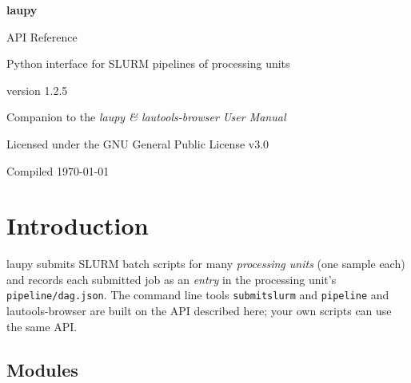 \documentclass[11pt,a4paper]{article}
\DeclareRobustCommand{\_}{\textunderscore\allowbreak}
\newcommand{\cmd}[1]{\texttt{#1}}
\begin{document}
\begin{titlepage}
  \centering
  \vspace*{3cm}
  {\sffamily\Huge\bfseries\color{accent} laupy\par}
  \vspace{0.6cm}
  {\sffamily\LARGE API Reference\par}
  \vspace{1.2cm}
  {\large Python interface for SLURM pipelines of processing units\par}
  \vspace{2cm}
  {\large version 1.2.5\par}
  \vfill
  {\small Companion to the \emph{laupy \& lautools-browser User Manual}\par}
  {\small Licensed under the GNU General Public License v3.0\par}
  {\small Compiled \today\par}
\end{titlepage}

\tableofcontents
\clearpage

\section{Introduction}

laupy submits SLURM batch scripts for many \emph{processing units} (one sample each) and
records each submitted job as an \emph{entry} in the processing unit's
\cmd{pipeline/dag.json}. The command line tools \cmd{submitslurm} and \cmd{pipeline} and
lautools-browser are built on the API described here; your own scripts can use the same API.

\subsection{Modules}
\end{document}
